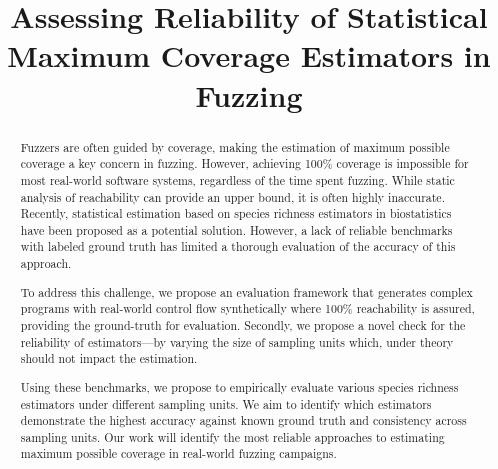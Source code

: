 \documentclass[conference]{IEEEtran}
\newcommand{\mytitle}{Assessing Reliability of Statistical Maximum Coverage Estimators in Fuzzing}
\begin{document}
\title{\mytitle}

\author{
\and 
{}
}

\maketitle

\thispagestyle{plain}
\pagestyle{plain} 


\begin{abstract}
Fuzzers are often guided by coverage, making the estimation of maximum
possible coverage a key concern in fuzzing.
However, achieving 100\% coverage is impossible for most real-world
software systems, regardless of the time spent fuzzing.
While static analysis of reachability can provide an upper bound,
it is often highly inaccurate.
Recently, statistical estimation based on species richness estimators
in biostatistics have been proposed as a potential solution.
However, a lack of reliable benchmarks with labeled ground truth has
limited a thorough evaluation of the accuracy of this approach.

To address this challenge, we propose an evaluation framework
that generates complex programs with real-world control flow synthetically
where 100\% reachability is assured, providing the
ground-truth for evaluation.
Secondly, we propose a novel check for the reliability of estimators---by
varying the size of sampling units which, under theory should not impact
the estimation.

Using these benchmarks, we propose to empirically evaluate various
species richness estimators under different sampling units.
We aim to identify which estimators demonstrate the highest accuracy against
known ground truth and consistency across sampling units.
Our work will identify the most reliable approaches to estimating maximum
possible coverage in real-world fuzzing campaigns.
\end{abstract}
\end{document}
